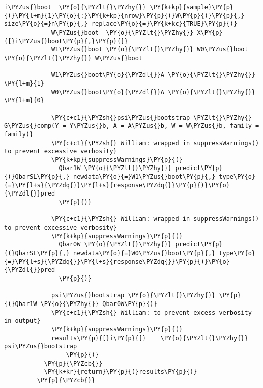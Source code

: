 \begin{Verbatim}[commandchars=\\\{\}]
             i\PYZus{}boot  \PY{o}{\PYZlt{}\PYZhy{}} \PY{k+kp}{sample}\PY{p}{(}\PY{l+m}{1}\PY{o}{:}\PY{k+kp}{nrow}\PY{p}{(}W\PY{p}{)}\PY{p}{,} size\PY{o}{=}n\PY{p}{,} replace\PY{o}{=}\PY{k+kc}{TRUE}\PY{p}{)}
             W\PYZus{}boot  \PY{o}{\PYZlt{}\PYZhy{}} X\PY{p}{[}i\PYZus{}boot\PY{p}{,}\PY{p}{]}
             W1\PYZus{}boot \PY{o}{\PYZlt{}\PYZhy{}} W0\PYZus{}boot \PY{o}{\PYZlt{}\PYZhy{}} W\PYZus{}boot
         
             W1\PYZus{}boot\PY{o}{\PYZdl{}}A \PY{o}{\PYZlt{}\PYZhy{}} \PY{l+m}{1}
             W0\PYZus{}boot\PY{o}{\PYZdl{}}A \PY{o}{\PYZlt{}\PYZhy{}} \PY{l+m}{0}  
               
             \PY{c+c1}{\PYZsh{}psi\PYZus{}bootstrap \PYZlt{}\PYZhy{} G\PYZus{}comp(Y = Y\PYZus{}b, A = A\PYZus{}b, W = W\PYZus{}b, family = family)}
             \PY{c+c1}{\PYZsh{} William: wrapped in suppressWarnings() to prevent excessive verbosity}
             \PY{k+kp}{suppressWarnings}\PY{p}{(}
               Qbar1W \PY{o}{\PYZlt{}\PYZhy{}} predict\PY{p}{(}QbarSL\PY{p}{,} newdata\PY{o}{=}W1\PYZus{}boot\PY{p}{,} type\PY{o}{=}\PY{l+s}{\PYZdq{}}\PY{l+s}{response\PYZdq{}}\PY{p}{)}\PY{o}{\PYZdl{}}pred
               \PY{p}{)} 
         
             \PY{c+c1}{\PYZsh{} William: wrapped in suppressWarnings() to prevent excessive verbosity}
             \PY{k+kp}{suppressWarnings}\PY{p}{(}
               Qbar0W \PY{o}{\PYZlt{}\PYZhy{}} predict\PY{p}{(}QbarSL\PY{p}{,} newdata\PY{o}{=}W0\PYZus{}boot\PY{p}{,} type\PY{o}{=}\PY{l+s}{\PYZdq{}}\PY{l+s}{response\PYZdq{}}\PY{p}{)}\PY{o}{\PYZdl{}}pred
               \PY{p}{)} 
         
             psi\PYZus{}bootstrap \PY{o}{\PYZlt{}\PYZhy{}} \PY{p}{(}Qbar1W \PY{o}{\PYZhy{}} Qbar0W\PY{p}{)}
             \PY{c+c1}{\PYZsh{} William: to prevent excess verbosity in output}
             \PY{k+kp}{suppressWarnings}\PY{p}{(}
             results\PY{p}{[}i\PY{p}{]}    \PY{o}{\PYZlt{}\PYZhy{}} psi\PYZus{}bootstrap
                 \PY{p}{)}
           \PY{p}{\PYZcb{}}
           \PY{k+kr}{return}\PY{p}{(}results\PY{p}{)}
         \PY{p}{\PYZcb{}}
\end{Verbatim}

